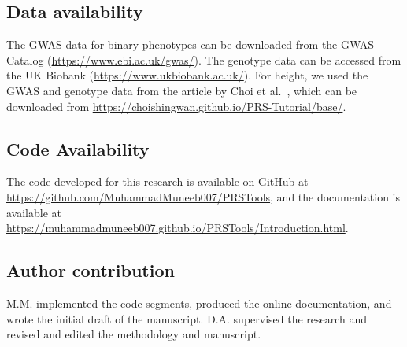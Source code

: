 \documentclass[pdflatex,sn-nature]{sn-jnl}%
\begin{document}
\subsection*{Data availability }
The GWAS data for binary phenotypes can be downloaded from the GWAS Catalog (\url{https://www.ebi.ac.uk/gwas/}). The genotype data can be accessed from the UK Biobank (\url{https://www.ukbiobank.ac.uk/}). For height, we used the GWAS and genotype data from the article by Choi et al.~\cite{Choi2020}, which can be downloaded from \url{https://choishingwan.github.io/PRS-Tutorial/base/}.


\subsection*{Code Availability}
The code developed for this research is available on GitHub at \url{https://github.com/MuhammadMuneeb007/PRSTools}, and the documentation is available at \url{https://muhammadmuneeb007.github.io/PRSTools/Introduction.html}.



\subsection*{Author contribution}
M.M. implemented the code segments, produced the online documentation, and wrote the initial draft of the manuscript. D.A. supervised the research and revised and edited the methodology and manuscript.
 
 

 


\end{document}
